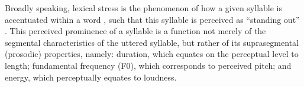 \documentclass[a4paper]{article}
\newcommand{\TODO}[1]{{\color{red}\textbf{[TODO #1]}}}
\begin{document}

Broadly speaking, lexical stress is the phenomenon of how a given syllable is accentuated within a word \cite{Cutler2005}, 
such that this syllable is perceived as ``standing out'' \cite{Dogil1999}. This perceived prominence of a syllable is a function not merely of the segmental characteristics of the uttered syllable, 
but rather of its suprasegmental (prosodic) properties, namely:
duration, which equates on the perceptual level to length;
fundamental frequency (F0), which corresponds to perceived pitch; and 
energy,
which perceptually equates to loudness.
\end{document}
